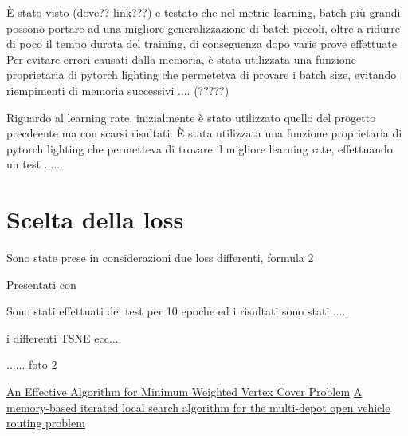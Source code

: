 \documentclass[11pt]{article}
\begin{document}
È stato visto (dove?? link???) e testato che nel metric learning, batch più grandi possono portare ad una migliore generalizzazione di batch piccoli, oltre a ridurre di poco il tempo durata del training, di conseguenza dopo varie prove effettuate
Per evitare errori causati dalla memoria, è stata utilizzata una funzione proprietaria di pytorch lighting che permetetva di provare i batch size, evitando riempimenti di memoria successivi .... (?????)


Riguardo al learning rate, inizialmente è stato utilizzato quello del progetto precdeente ma con scarsi risultati. È stata utilizzata una funzione proprietaria di pytorch lighting che permetteva di trovare il migliore learning rate, effettuando un test ......



\section{Scelta della loss}

Sono state prese in considerazioni due loss differenti, 
formula 2

Presentati con 

Sono stati effettuati dei test per 10 epoche ed i risultati sono stati .....

i differenti TSNE ecc....


...... foto 2



\pagebreak

\begin{thebibliography}{5}


 \href{https://www.researchgate.net/publication/242463011_An_Effective_Algorithm_for_Minimum_Weighted_Vertex_Cover_problem}{An Effective Algorithm for Minimum Weighted Vertex Cover Problem}
 \href{https://www.sciencedirect.com/science/article/abs/pii/S0377221720300278}{A memory-based iterated local search algorithm for the multi-depot open vehicle routing problem}

\end{thebibliography}


\pagebreak
\end{document}
